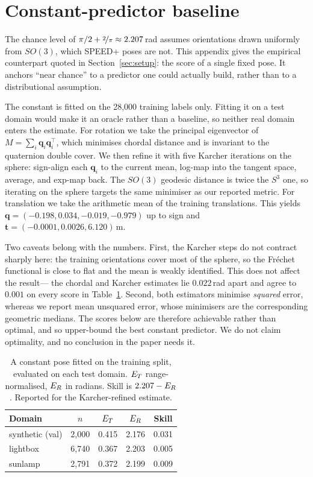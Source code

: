 \section{Constant-predictor baseline}
\label{app:constant}

The chance level of $\pi/2 + \nicefrac{2}{\pi} \approx 2.207$\,rad assumes orientations
drawn uniformly from $SO(3)$, which SPEED+ poses are not. This appendix gives the
empirical counterpart quoted in Section~\ref{sec:setup}: the score of a single fixed
pose. It anchors ``near chance'' to a predictor one could actually build, rather than to
a distributional assumption.

The constant is fitted on the 28{,}000 training labels only. Fitting it on a test
domain would make it an oracle rather than a baseline, so neither real domain enters
the estimate. For rotation we take the principal eigenvector of
$M = \sum_i \mathbf{q}_i \mathbf{q}_i^{\top}$, which minimises chordal distance and is
invariant to the quaternion double cover. We then refine it with five Karcher iterations
on the sphere: sign-align each $\mathbf{q}_i$ to the current mean, log-map into the
tangent space, average, and exp-map back. The $SO(3)$ geodesic distance is twice the
$S^3$ one, so iterating on the sphere targets the same minimiser as our reported
metric. For translation we take the arithmetic mean of the training translations.
This yields $\mathbf{q} = (-0.198, 0.034, -0.019, -0.979)$ up to sign and
$\mathbf{t} = (-0.0001, 0.0026, 6.120)$\,m.

Two caveats belong with the numbers. First, the Karcher steps do not contract sharply
here: the training orientations cover most of the sphere, so the Fr\'echet functional
is close to flat and the mean is weakly identified. This does not affect the result---
the chordal and Karcher estimates lie $0.022$\,rad apart and agree to $0.001$ on every
score in Table~\ref{tab:constant}. Second, both estimators minimise \emph{squared}
error, whereas we report mean unsquared error, whose minimisers are the corresponding
geometric medians. The scores below are therefore achievable rather than optimal, and so
upper-bound the best constant predictor. We do not claim optimality, and no conclusion in
the paper needs it.

\begin{table}[ht]
  \caption{A constant pose fitted on the training split, evaluated on each test
  domain. $E_{T}$ range-normalised, $E_{R}$ in radians. Skill is
  $2.207 - E_{R}$. Reported for the Karcher-refined estimate.}
  \label{tab:constant}
  \centering
  \small
  \begin{tabular}{l c cc c}
    \toprule
    Domain & $n$ & $E_{T}$ & $E_{R}$ & Skill \\
    \midrule
    synthetic (val) & 2{,}000 & 0.415 & 2.176 & 0.031 \\
    lightbox & 6{,}740 & 0.367 & 2.203 & 0.005 \\
    sunlamp & 2{,}791 & 0.372 & 2.199 & 0.009 \\
    \bottomrule
  \end{tabular}
\end{table}

